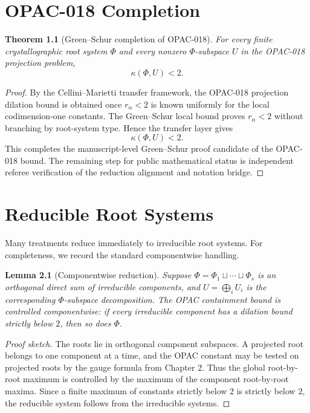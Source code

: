 \documentclass[11pt]{book}
\newtheorem{theorem}{Theorem}[chapter]
\newtheorem{lemma}[theorem]{Lemma}
\theoremstyle{definition}
\newcommand{\GS}{Green--Schur}
\begin{document}
\chapter{OPAC-018 Completion}
\begin{theorem}[\GS{} completion of OPAC-018]\label{thm:completion}
For every finite crystallographic root system $\Phi$ and every nonzero $\Phi$-subspace $U$ in the OPAC-018 projection problem,
\[
 \boxed{\kappa(\Phi,U)<2.}
\]
\end{theorem}
\begin{proof}
By the Cellini--Marietti transfer framework, the OPAC-018 projection dilation bound is obtained once $r_\alpha<2$ is known uniformly for the local codimension-one constants. The \GS{} local bound proves $r_\alpha<2$ without branching by root-system type. Hence the transfer layer gives
\[
 \kappa(\Phi,U)<2.
\]
This completes the manuscript-level \GS{} proof candidate of the OPAC-018 bound. The remaining step for public mathematical status is independent referee verification of the reduction alignment and notation bridge.
\end{proof}

\chapter{Reducible Root Systems}
Many treatments reduce immediately to irreducible root systems. For completeness, we record the standard componentwise handling.

\begin{lemma}[Componentwise reduction]\label{lem:reducible}
Suppose $\Phi=\Phi_1\sqcup\cdots\sqcup\Phi_s$ is an orthogonal direct sum of irreducible components, and $U=\bigoplus_i U_i$ is the corresponding $\Phi$-subspace decomposition. The OPAC containment bound is controlled componentwise: if every irreducible component has a dilation bound strictly below $2$, then so does $\Phi$.
\end{lemma}
\begin{proof}[Proof sketch]
The roots lie in orthogonal component subspaces. A projected root belongs to one component at a time, and the OPAC constant may be tested on projected roots by the gauge formula from Chapter 2. Thus the global root-by-root maximum is controlled by the maximum of the component root-by-root maxima. Since a finite maximum of constants strictly below $2$ is strictly below $2$, the reducible system follows from the irreducible systems.
\end{proof}
\end{document}
